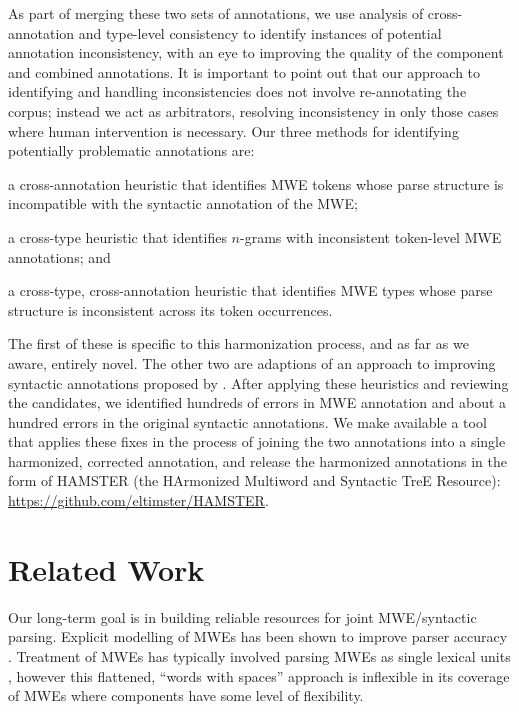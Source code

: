 \documentclass[output=paper
,modfonts
,nonflat]{langsci/langscibook}
\newcommand{\ngram}[1][]{$n$-gram{#1}\xspace}
\begin{document}
As part of merging these two sets of annotations, we use analysis of cross-annotation and type-level consistency to identify instances of potential annotation inconsistency, with an eye to improving the quality of the component and combined annotations. It is important to point out that our approach to identifying and handling inconsistencies does not involve re-annotating the corpus; instead we act as arbitrators, resolving inconsistency in only those cases where human intervention is necessary. Our three methods for identifying potentially problematic annotations are:
\begin{compactitem}
\item a cross-annotation heuristic that identifies MWE tokens whose parse structure is incompatible with the syntactic annotation of the MWE;
\item a cross-type heuristic that identifies \ngram[s] with inconsistent token-level MWE annotations; and
\item a cross-type, cross-annotation heuristic that identifies MWE types whose parse structure is inconsistent across its token occurrences.
\end{compactitem}
The first of these is specific to this harmonization process, and as far as we aware, entirely novel. The other two are adaptions of an approach to improving syntactic annotations proposed by \citet{Dickinson03}. After applying these heuristics and reviewing the candidates, we identified hundreds of errors in MWE annotation and about a hundred errors in the original syntactic annotations. We make available a tool that applies these fixes in the process of joining the two annotations into a single harmonized, corrected annotation, and release the harmonized annotations in the form of HAMSTER (the HArmonized Multiword and Syntactic TreE Resource): \url{https://github.com/eltimster/HAMSTER}.


\section{Related Work}
\label{sec:relwork}

Our long-term goal is in building reliable resources for joint MWE/syntactic parsing. Explicit modelling of MWEs has been shown to improve parser accuracy \citep{Nivre04,Finkel:2009:JPN:1620754.1620802,Korkontzelos:2010:RME:1857999.1858088,Green:2013:PMI:2464100.2464109,Vincze13,Candito14,Constant16}. Treatment of MWEs has typically involved parsing MWEs as single lexical units \citep{Nivre04,Eryigit:2011:MES:2206359.2206365,Fotopoulou14}, however this flattened, ``words with spaces'' \citep{Sag02} approach is inflexible in its coverage of MWEs where components have some level of flexibility.
\end{document}
